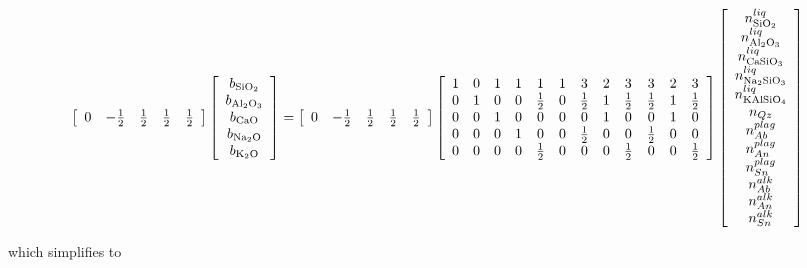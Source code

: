 \documentclass[11pt, titlepage, twoside]{article}
\begin{document}
\begin{MPEquation}[!ht]
\begin{equation}
\left[ {\begin{array}{*{20}{c}}
0&{ - \frac{1}{2}}&{\frac{1}{2}}&{\frac{1}{2}}&{\frac{1}{2}}
\end{array}} \right]\left[ {\begin{array}{*{20}{c}}
{{b_{{\rm{Si}}{{\rm{O}}_2}}}}\\
{{b_{{\rm{A}}{{\rm{l}}_2}{{\rm{O}}_3}}}}\\
{{b_{{\rm{CaO}}}}}\\
{{b_{{\rm{N}}{{\rm{a}}_2}{\rm{O}}}}}\\
{{b_{{{\rm{K}}_2}{\rm{O}}}}}
\end{array}} \right] = \left[ {\begin{array}{*{20}{c}}
0&{ - \frac{1}{2}}&{\frac{1}{2}}&{\frac{1}{2}}&{\frac{1}{2}}
\end{array}} \right]\left[ {\begin{array}{*{20}{c}}
1&0&1&1&1&1&3&2&3&3&2&3\\
0&1&0&0&{\frac{1}{2}}&0&{\frac{1}{2}}&1&{\frac{1}{2}}&{\frac{1}{2}}&1&{\frac{1}{2}}\\
0&0&1&0&0&0&0&1&0&0&1&0\\
0&0&0&1&0&0&{\frac{1}{2}}&0&0&{\frac{1}{2}}&0&0\\
0&0&0&0&{\frac{1}{2}}&0&0&0&{\frac{1}{2}}&0&0&{\frac{1}{2}}
\end{array}} \right]\left[ {\begin{array}{*{20}{c}}
{n_{{\rm{Si}}{{\rm{O}}_2}}^{liq}}\\
{n_{{\rm{A}}{{\rm{l}}_2}{{\rm{O}}_3}}^{liq}}\\
{n_{{\rm{CaSi}}{{\rm{O}}_3}}^{liq}}\\
{n_{{\rm{N}}{{\rm{a}}_2}{\rm{Si}}{{\rm{O}}_3}}^{liq}}\\
{n_{{\rm{KAlSi}}{{\rm{O}}_4}}^{liq}}\\
{{n_{Qz}}}\\
{n_{Ab}^{plag}}\\
{n_{An}^{plag}}\\
{n_{Sn}^{plag}}\\
{n_{Ab}^{alk}}\\
{n_{An}^{alk}}\\
{n_{Sn}^{alk}}
\end{array}} \right]
\end{equation}
\label{MPEquationElement:E668E6FE-998E-43D3-8FE5-3CF403D519E7}
\end{MPEquation}
which simplifies to
\end{document}
